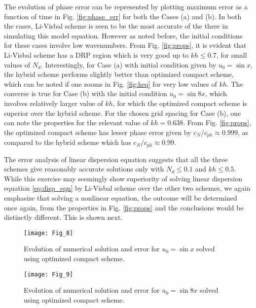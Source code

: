 \documentclass{svjour3}                    %
\begin{document}
The evolution of phase error can be represented by plotting maximum error as a function of time in Fig. \ref{fig:phase_err} for both the Cases (a) and
(b). In both the cases, Li-Visbal scheme is seen to be the most accurate of the three in simulating this model equation. However as noted before, the initial conditions for these cases involve low wavenumbers. From Fig. \ref{fig:props}, it is evident that Li-Visbal scheme has a DRP region which is 
very good up to $kh \leq 0.7$, for small values of $N_d$. Interestingly, for Case (a) with initial condition given by $u_0 = \sin x$, the hybrid scheme performs slightly better than optimized compact scheme, which can be noted if one zooms in Fig. \ref{fig:keq} for very low values of $kh$. The converse 
is true for Case (b) with the initial condition $u_0 = \sin 8x$, which involves relatively larger value of $kh$, for which the optimized compact scheme 
is superior over the hybrid scheme. For the chosen grid spacing for Case (b), one can note the properties for the relevant value of $kh=0.638$. From 
Fig. \ref{fig:props}, the optimized compact scheme has lesser phase error given by $c_N/c_{ph} \approx 0.999$, as compared to the hybrid scheme which 
has $c_N/c_{ph} \approx 0.99$.

The error analysis of linear dispersion equation suggests that all the three schemes give reasonably accurate solutions only with $N_d \leq 0.1$ and $kh \leq 0.5$. While this exercise may seemingly show superiority of solving linear dispersion equation \eqref{eq:disp_eqn} by Li-Visbal scheme over the other two schemes, we again emphasize that solving a nonlinear equation, the outcome will be determined once again, from the properties in Fig. \ref{fig:props} and the conclusions would be distinctly different. This is shown next. 

\begin{figure}[!h]
\center
\texttt{[image: Fig\_8]}
\caption{Evolution of numerical solution and error for $u_0=\sin x$ solved using optimized compact scheme.}
\label{fig:low1}
\end{figure}

\begin{figure}[!h]
\center
\texttt{[image: Fig\_9]}
\caption{Evolution of numerical solution and error for $u_0=\sin 8x$ solved using optimized compact scheme.}
\label{fig:mid1}
\end{figure}
\end{document}
